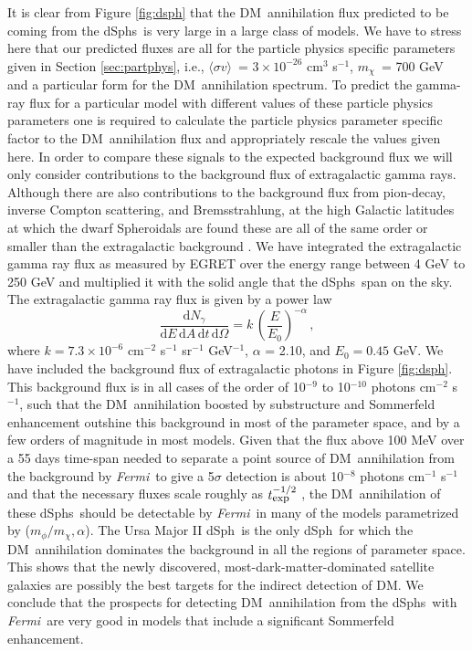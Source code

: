 \documentclass[aps,prd,twocolumn,amsmath,amssymb,floatfix,nofootinbib,10pt]{revtex4}
\newcommand{\ie}{i.e.}
\newcommand{\Fermi}{\emph{Fermi}}
\newcommand{\DM}{DM}
\newcommand{\mdm}{\ensuremath{m_{\chi}}}
\newcommand{\mv}{\ensuremath{m_{\phi}}}
\newcommand{\dd}{\mathrm{d}}
\newcommand{\Ngamma}{\ensuremath{N_{\gamma}}}
\newcommand{\sigmaannv}{\ensuremath{\langle\sigma v\rangle}}
\newcommand{\dSph}{dSph}
\newcommand{\dSphs}{dSphs}
\begin{document}
It is clear from Figure \ref{fig:dsph} that the \DM\ annihilation flux
predicted to be coming from the \dSphs\ is very large in a large class
of models. We have to stress here that our predicted fluxes are all
for the particle physics specific parameters given in Section
\ref{sec:partphys}, \ie, \sigmaannv\ = $3 \times 10^{-26}$ cm$^3$
s$^{-1}$, \mdm\ = 700 GeV and a particular form for the \DM\
annihilation spectrum. To predict the gamma-ray flux for a particular
model with different values of these particle physics parameters one
is required to calculate the particle physics parameter specific
factor to the \DM\ annihilation flux and appropriately rescale the
values given here. In order to compare these signals to the expected
background flux we will only consider contributions to the background
flux of extragalactic gamma rays. Although there are also
contributions to the background flux from pion-decay, inverse Compton
scattering, and Bremsstrahlung, at the high Galactic latitudes at
which the dwarf Spheroidals are found these are all of the same order
or smaller than the extragalactic background
\cite{2004ApJ...613..962S}. We have integrated the extragalactic gamma
ray flux as measured by EGRET over the energy range between 4 GeV to
250 GeV and multiplied it with the solid angle that the \dSphs\ span
on the sky. The extragalactic gamma ray flux is given by a power law
\cite{1998ApJ...494..523S}
\begin{equation}
\frac{\dd \Ngamma}{\dd E \,\dd A \, \dd t\,\dd \Omega} = k\,\left(\frac{E}{E_0}\right)^{-\alpha}\, ,
\end{equation}
where $k = 7.3 \times 10^{-6}$ cm$^{-2}$ s$^{-1}$ sr$^{-1}$
GeV$^{-1}$, $\alpha$ = 2.10, and $E_0 = 0.45$ GeV. We have included
the background flux of extragalactic photons in Figure
\ref{fig:dsph}. This background flux is in all cases of the order of
10$^{-9}$ to 10$^{-10}$ photons cm$^{-2}$ s$^{-1}$, such that the \DM\
annihilation boosted by substructure and Sommerfeld enhancement
outshine this background in most of the parameter space, and by a few
orders of magnitude in most models. Given that the flux above 100 MeV
over a 55 days time-span needed to separate a point source of \DM\
annihilation from the background by \Fermi\ to give a 5$\sigma$
detection is about 10$^{-8}$ photons cm$^{-1}$ s$^{-1}$ and that the
necessary fluxes scale roughly as $t_{\mbox{{\footnotesize
exp}}}^{-1/2}$ \cite{2008JCAP...07..013B}, the \DM\ annihilation of
these \dSphs\ should be detectable by \Fermi\ in many of the models
parametrized by ($\mv/\mdm,\alpha$). The Ursa Major II \dSph\ is the
only \dSph\ for which the \DM\ annihilation dominates the background
in all the regions of parameter space. This shows that the newly
discovered, most-dark-matter-dominated satellite galaxies are possibly
the best targets for the indirect detection of \DM. We conclude that
the prospects for detecting \DM\ annihilation from the \dSphs\ with
\Fermi\ are very good in models that include a significant Sommerfeld
enhancement.
\end{document}
